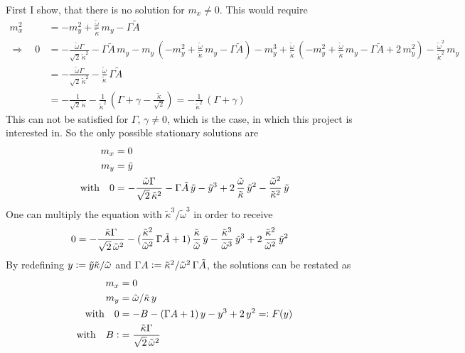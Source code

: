 \documentclass{article}
\begin{document}
First I show, that there is no solution for $m_x\neq0$. This would require
\begin{align*}
    m_x^2&=-m_y^2+\frac{\tilde{\omega}}{\tilde{\kappa}}\,m_y-\Gamma\tilde{A} \\
    \Rightarrow\quad0&=-\frac{\tilde{\omega}\Gamma}{\sqrt{2}\,\tilde{\kappa}^2}-\Gamma\tilde{A}\,m_y    -m_y\,(-m_y^2+\frac{\tilde{\omega}}{\tilde{\kappa}}\,m_y-\Gamma\tilde{A})- m_y^3+\frac{\tilde{\omega}}{\tilde{\kappa}}\,(-m_y^2+\frac{\tilde{\omega}}{\tilde{\kappa}}\,m_y-\Gamma\tilde{A}+2\,m_y^2)-\frac{\tilde{\omega}^2}{\tilde{\kappa}^2}\,m_y  \\
    &=-\frac{\tilde{\omega}\Gamma}{\sqrt{2}\,\tilde{\kappa}^2}-\frac{\tilde{\omega}}{\tilde{\kappa}}\,\Gamma\tilde{A}\\
    &=-\frac{1}{\sqrt{2}\,\tilde{\kappa}}-\frac{1}{\tilde{\kappa}^2}\,(\Gamma+\gamma-\frac{\tilde{\kappa}}{\sqrt{2}})=-\frac{1}{\tilde{\kappa}^2}\,(\Gamma+\gamma)
\end{align*} 
This can not be satisfied for $\Gamma,\,\gamma\neq0$, which is the case, in which this project is interested in. So the only possible stationary solutions are
\begin{align*}
    m_x&=0\\
    m_y&=\tilde{y}\\
    \text{with}\quad0&=-\frac{\tilde{\omega}\Gamma}{\sqrt{2}\,\tilde{\kappa}^2}-\Gamma\tilde{A}\,\tilde{y}    - \tilde{y}^3+2\,\frac{\tilde{\omega}}{\tilde{\kappa}}\,\tilde{y}^2-\frac{\tilde{\omega}^2}{\tilde{\kappa}^2}\,\tilde{y}  
\end{align*}
One can multiply the equation with $\tilde{\kappa}^3/\tilde{\omega}^3$ in order to receive
\begin{align*}
    0&=-\frac{\tilde{\kappa}\Gamma}{\sqrt{2}\,\tilde{\omega}^2}-(\frac{\tilde{\kappa}^2}{\tilde{\omega}^2}\,\Gamma\tilde{A}+1)\,\frac{\tilde{\kappa}}{\tilde{\omega}}\,\tilde{y}    - \frac{\tilde{\kappa}^3}{\tilde{\omega}^3}\,\tilde{y}^3+2\,\frac{\tilde{\kappa}^2}{\tilde{\omega}^2}\,\tilde{y}^2 
\end{align*}
By redefining ${y}\vcentcolon=\tilde{y}\tilde{\kappa}/\tilde{\omega}$ and $\Gamma A\vcentcolon=\tilde{\kappa}^2/\tilde{\omega}^2\,\Gamma\tilde{A}$, the solutions can be restated as
\begin{align*}
    m_x&=0\\
    m_y&=\tilde{\omega}/\tilde{\kappa}\,{y}\\
    \text{with}\quad0&=-B-(\Gamma A+1)\,{y}    - {y}^3+2\,{y}^2=\vcentcolon F({y})\\
    \text{with}\quad B\vcentcolon&= \frac{\tilde{\kappa}\Gamma}{\sqrt{2}\,\tilde{\omega}^2}
\end{align*}
\end{document}

